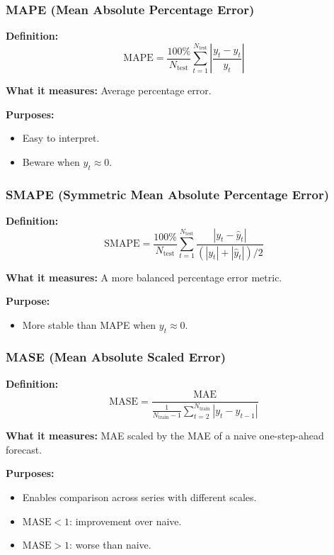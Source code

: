 \documentclass{Configuration_Files/PoliMi3i_thesis}
\begin{document}
\subsubsection{MAPE (Mean Absolute Percentage Error)}
\vspace{0.5em}
\textbf{Definition:}
\[
\text{MAPE} = \frac{100\%}{N_{\text{test}}} \sum_{t=1}^{N_{\text{test}}} \left| \frac{y_t - \hat{y}_t}{y_t} \right|
\]

\textbf{What it measures:}  
Average percentage error.

\textbf{Purposes:}
\begin{itemize}
  \item Easy to interpret.
  \item Beware when $y_t \approx 0$.
\end{itemize}

\subsubsection{SMAPE (Symmetric Mean Absolute Percentage Error)}
\vspace{0.5em}
\textbf{Definition:}
\[
\text{SMAPE} = \frac{100\%}{N_{\text{test}}} \sum_{t=1}^{N_{\text{test}}} \frac{|y_t - \hat{y}_t|}{(|y_t| + |\hat{y}_t|)/2}
\]

\textbf{What it measures:}  
A more balanced percentage error metric.

\textbf{Purpose:}
\begin{itemize}
  \item More stable than MAPE when $y_t \approx 0$.
\end{itemize}

\subsubsection{MASE (Mean Absolute Scaled Error)}
\vspace{0.5em}
\textbf{Definition:}
\[
\text{MASE} = \frac{\text{MAE}}{\frac{1}{N_{\text{train}} - 1} \sum_{t=2}^{N_{\text{train}}} |y_t - y_{t-1}|}
\]

\textbf{What it measures:}  
MAE scaled by the MAE of a naive one-step-ahead forecast.

\textbf{Purposes:}
\begin{itemize}
  \item Enables comparison across series with different scales.
  \item $\text{MASE} < 1$: improvement over naive.
  \item $\text{MASE} > 1$: worse than naive.
\end{itemize}
\end{document}
